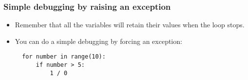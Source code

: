 \documentclass[10pt,article]{article}
\begin{document}
\subsubsection{Simple debugging by raising an exception}
\label{sec:orgc926013}
\begin{itemize}
\item Remember that all the variables will retain their values when the loop stops.
\item You can do a simple debugging by forcing an exception:

\begin{verbatim}
  for number in range(10):
      if number > 5:
          1 / 0
\end{verbatim}
\end{itemize}
\end{document}
